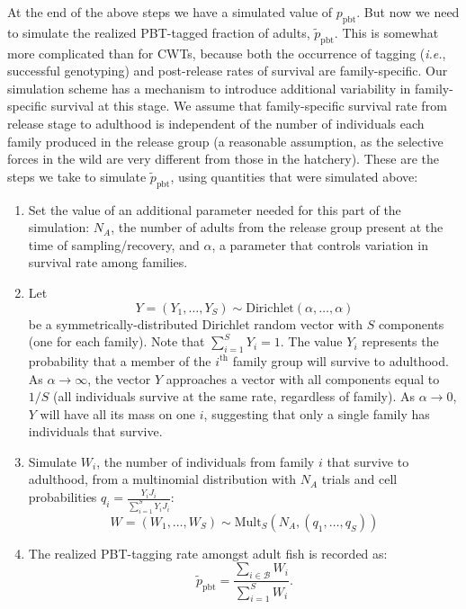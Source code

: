 \documentclass[11pt]{article}
\newcommand{\thh}{^\mathrm{th}}
\newcommand{\ie}{{\em i.e.},\xspace }
\begin{document}
At the end of the above steps we have a simulated value of $p_\mathrm{pbt}$.  But now we
need to simulate the realized PBT-tagged fraction of adults, $\tilde{p}_\mathrm{pbt}$. 
This is somewhat more complicated than for CWTs, because both the occurrence of tagging (\ie successful genotyping)
and post-release rates of survival
are family-specific.  Our simulation scheme has a mechanism to introduce additional
variability in family-specific survival at this stage.  We assume that family-specific survival rate from release
stage to adulthood is independent of the number of individuals each family produced in the release
group (a reasonable assumption, as the selective forces in the wild are very different from those in the 
hatchery).    These are the steps we take to simulate $\tilde{p}_\mathrm{pbt}$, using
quantities that were simulated above:
\begin{enumerate}
\item Set the value of an additional parameter needed for this part of the simulation: $N_A$, the number
of adults from the release group present at the time of sampling/recovery, and $\alpha$,
a parameter that controls variation in survival rate among families. 
\item Let 
\[
Y = (Y_1,\ldots, Y_S) \sim \mathrm{Dirichlet}(\alpha, \ldots, \alpha)
\]
be a symmetrically-distributed Dirichlet random vector with $S$ components (one for each family).  Note that
$\sum_{i=1}^S Y_i =1$.  The value $Y_i$ represents the probability that a member of the $i\thh$ family group
will survive to adulthood.  As $\alpha \rightarrow \infty$, the vector $Y$ approaches a vector with
all components equal to $1/S$ (all individuals survive at the same rate, regardless of family).  As $\alpha
\rightarrow 0$, $Y$ will have all its mass on one $i$, suggesting that only a single family has individuals
that survive.
\item Simulate $W_i$, the number of individuals from family $i$
that survive to adulthood, from a multinomial distribution
with $N_A$ trials and cell probabilities $q_i = \frac{Y_i J_i}{\sum_{i=1}^S Y_i J_i}$:
\[
W = (W_1,\ldots, W_S) \sim \mathrm{Mult}_S(N_A, (q_1, \ldots, q_S))
\]
\item The realized PBT-tagging rate amongst adult fish is recorded as:
\[
\tilde{p}_\mathrm{pbt} = \frac{\sum_{i\in\mathcal{B}} W_i}{\sum_{i=1}^S W_i}.
\]
\end{enumerate}
\end{document}
